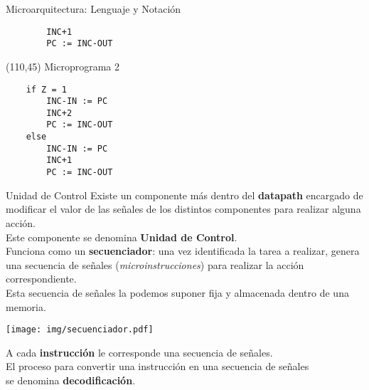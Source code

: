 \documentclass[aspectratio=169]{beamer}
\begin{document}
\begin{frame}[fragile,t]{Microarquitectura: Lenguaje y Notación}
\begin{textblock}{76}
\begin{verbatim}
        INC+1
        PC := INC-OUT
    \end{verbatim}
    \end{textblock}
    \begin{textblock}{76}(110,45)
    \scriptsize
    \textcolor{verdeuca}{Microprograma 2}\\
    \vspace{-0.3cm}
    \begin{verbatim}
    if Z = 1
        INC-IN := PC
        INC+2
        PC := INC-OUT
    else
        INC-IN := PC
        INC+1
        PC := INC-OUT
    \end{verbatim}
    \end{textblock}
\end{frame}

\begin{frame}[fragile,t]{Unidad de Control}
    Existe un componente más dentro del \textbf{datapath} encargado de modificar el valor de las señales de los distintos componentes para realizar alguna acción.\\
    \bigskip
    Este componente se denomina \textbf{Unidad de Control}.\\
    \bigskip
    \pause
    Funciona como un \textbf{secuenciador}: una vez identificada la tarea a realizar, genera una secuencia de señales (\emph{microinstrucciones}) para realizar la acción correspondiente.\\
    Esta secuencia de señales la podemos suponer fija y almacenada dentro de una memoria.\\
    \begin{center}
    \texttt{[image: img/secuenciador.pdf]}
    \end{center}
    A cada \textbf{instrucción} le corresponde una secuencia de señales.\\
    El proceso para convertir una instrucción en una secuencia de señales\\
    se denomina \textbf{decodificación}.
\end{frame}
\end{document}
